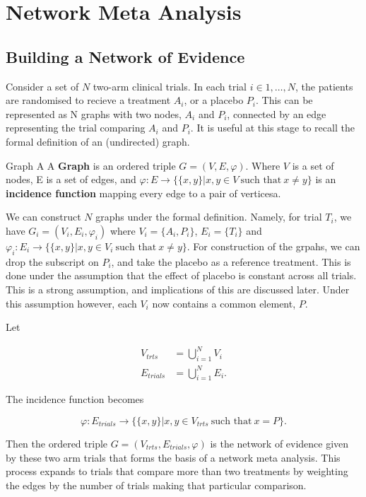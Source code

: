 \chapter{Network Meta Analysis}

\section{Building a Network of Evidence}

Consider a set of $N$ two-arm clinical trials. In each trial $i \in 1,\ldots,N$, the patients are randomised to recieve a treatment $A_i$, or a placebo $P_i$. This can be represented as N graphs with two nodes, $A_i$ and $P_i$, connected by an edge representing the trial comparing $A_i$ and $P_i$. It is useful at this stage to recall the formal definition of an (undirected) graph. 

\begin{definition}{Graph}
A  A \textbf{Graph} is an ordered triple $G = (V, E, \varphi)$. Where  $V$ is a set of nodes, E is a set  of edges, and $\varphi : E \to \{\{ x, y \} | x, y \in V \ \text{such that} \ x \neq y \}$ is an  \textbf{incidence function} mapping every edge to a pair of verticesa.
\end{definition}

We can construct $N$ graphs under the formal definition. Namely, for trial $T_i$, we have $G_i = (V_i, E_i, \varphi_i)$ where $V_i = \{ A_i, P_i \}$, $E_i = \{T_i\}$ and $\varphi_i : E_i \to \{ \{ x, y \} | x, y \in V_i \ \text{such that} \  x \neq y \}$. For construction of the grpahs, we can drop the subscript on $P_i$, and take the placebo as a reference treatment. This is done under the assumption that the effect of placebo is constant across all trials. This is a strong assumption, and implications of this are discussed later. Under this assumption however, each $V_i$ now contains a common element, $P$.

Let

\begin{align*}
    V_{trts} &= \bigcup_{i=1}^{N} V_i \\
    E_{trials} &= \bigcup_{i=1}^{N} E_i
.\end{align*}

The incidence function becomes 

\[
    \varphi : E_{trials} \to \{ \{x, y \} | x, y \in V_{trts} \ \text{such that} \ x = P \}
.\] 

Then the ordered triple $G = (V_{trts}, E_{trials}, \varphi)$ is the network of evidence given by these two arm trials that forms the basis of a network meta analysis. This process expands to trials that compare more than two treatments by weighting the edges by the number of trials making that particular comparison.

